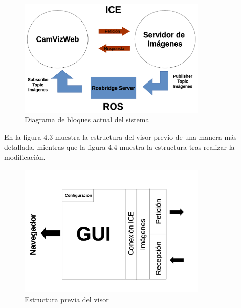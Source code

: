 \begin{figure}[H]
  \begin{center}
    \includegraphics[width=0.8\textwidth]{figures/esquemacamviz2.png}
		\caption{Diagrama de bloques actual del sistema}
		\label{fig.esquemacamviz2}
		\end{center}
\end{figure}

En la figura 4.3 muestra la estructura del visor previo de una manera más detallada, mientras que la figura 4.4 muestra la estructura tras realizar la modificación.

\begin{figure}[H]
  \begin{center}
    \includegraphics[width=0.8\textwidth]{figures/disenocamviz1.png}
		\caption{Estructura previa del visor}
		\label{fig.estructuracamviz2}
		\end{center}
\end{figure}

